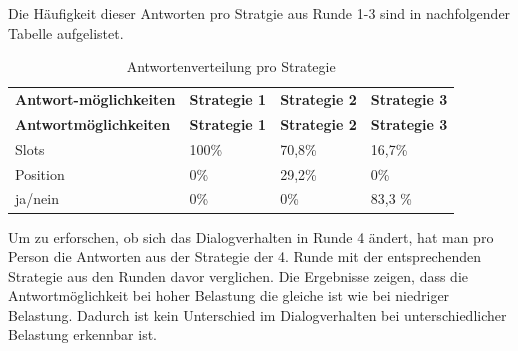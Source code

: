 \documentclass[12pt,a4paper]{scrartcl}
\begin{document}
Die Häufigkeit dieser Antworten pro Stratgie aus Runde 1-3 sind in nachfolgender Tabelle aufgelistet.

\begin{longtable}{p{3cm}p{3cm}p{3cm}p{3cm} }
	\label{Dialogverhalten12}\\
	\caption[Antwortenverteilung pro Strategie]{Antwortenverteilung pro Strategie}\\
	\hline
\textbf{Antwort-möglichkeiten}&\textbf{Strategie 1}&\textbf{Strategie 2} &\textbf{Strategie 3}\\
	\hline
	\endfirsthead
	\hline
	\textbf{Antwortmöglichkeiten}&\textbf{Strategie 1}&\textbf{Strategie 2} &\textbf{Strategie 3}\\
	\hline
	\endhead
Slots & 100\% & 70,8\%\ & 16,7\%  \\
Position & 0\% & 29,2\% & 0\%  \\
ja/nein & 0\% & 0\%  & 83,3 \%  \\
\hline
\end{longtable}

Um zu erforschen, ob sich das Dialogverhalten in Runde 4 ändert, hat man pro Person die Antworten aus der Strategie der 4. Runde mit der entsprechenden Strategie aus den Runden davor verglichen. Die Ergebnisse zeigen, dass die Antwortmöglichkeit bei hoher Belastung die gleiche ist wie bei niedriger Belastung. Dadurch ist kein Unterschied im Dialogverhalten bei unterschiedlicher Belastung erkennbar ist. 
\end{document}
